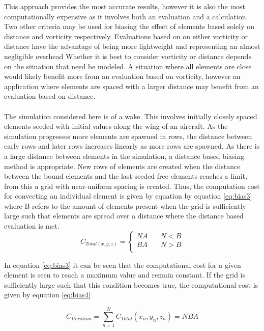 This approach provides the most accurate results, however it is also the most computationally expensive as it involves both an evaluation and a calculation. Two other criteria may be used for biasing the effect of elements based solely on distance and vorticity respectively. Evaluations based on on either vorticity or distance have the advantage of being more lightweight and representing an almost negligible overhead Whether it is best to consider vorticity or distance depends on the situation that need be modeled. A situation where all elements are close would likely benefit more from an evaluation based on vorticity, however an application where elements are spaced with a larger distance may benefit from an evaluation based on distance.
\\\\
The simulation considered here is of a wake. This involves initially closely spaced elements seeded with initial values along the wing of an aircraft. As the simulation progresses more elements are spawned in rows, the distance between early rows and later rows increases linearly as more rows are spawned. As there is a large distance between elements in the simulation, a distance based biasing method is appropriate. New rows of elements are created when the distance between the bound elements and the last seeded free elements reaches a limit, from this a grid with near-uniform spacing is created. Thus, the computation cost for convecting an individual element is given by equation by equation \ref{eq:bias3} where B refers to the amount of elements present when the grid is sufficiently large such that elements are spread over a distance where the distance based evaluation is met.
\begin{equation}
\label{eq:bias3}
C_{Total(x,y,z)}=\begin{cases}
    NA       & \quad N<B\\
    BA  & \quad N>B\\
  \end{cases}
\end{equation}

In equation \ref{eq:bias3} it can be seen that the computational cost for a given element is seen to reach a maximum value and remain constant. If the grid is sufficiently large such that this condition becomes true, the computational cost is given by equation \ref{eq:bias4}

\begin{equation}
\label{eq:bias4}
C_{Iteration}=\sum_{n=1}^{N} C_{Total}(x_n,y_n,z_n)=NBA
\end{equation}

